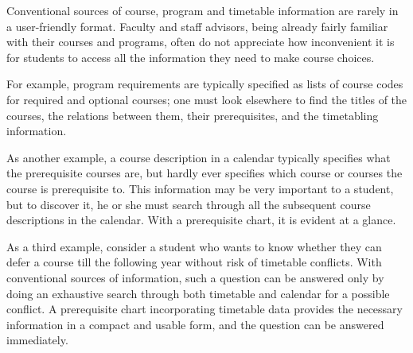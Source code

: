 \documentclass[11pt]{article}
\begin{document}
Conventional sources of course, program and timetable information are
rarely in a user-friendly format. Faculty and staff advisors, being already
fairly familiar with their courses and programs, often do not appreciate
how inconvenient it is for students to access all the information they need
to make course choices.

For example, program requirements are typically specified as lists of
course codes for required and optional courses; one must look elsewhere to
find the titles of the courses, the relations between them, their
prerequisites, and the timetabling information.

As another example, a course description in a calendar typically specifies
what the prerequisite courses are, but hardly ever specifies which course
or courses the course is prerequisite to. This information may be very
important to a student, but to discover it, he or she must search through
all the subsequent course descriptions in the calendar. With a prerequisite
chart, it is evident at a glance.

As a third example, consider a student who wants to know whether they can
defer a course till the following year without risk of timetable conflicts.
With conventional sources of information, such a question can be answered
only by doing an exhaustive search through both timetable and calendar for
a possible conflict. A prerequisite chart incorporating timetable data provides
the necessary information in a compact and usable form, and the question
can be answered immediately.
\end{document}
